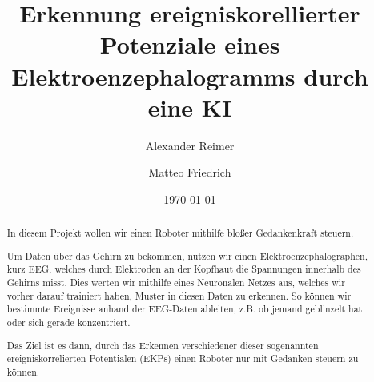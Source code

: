 \documentclass{scrartcl}
\title{Erkennung ereigniskorellierter Potenziale eines Elektroenzephalogramms durch eine KI }
\date{\today}
\author{Alexander Reimer \and Matteo Friedrich}
\begin{document}
	\maketitle
    \begin{abstract}
		In diesem Projekt wollen wir einen Roboter mithilfe bloßer Gedankenkraft steuern.
		
		Um Daten über das Gehirn zu bekommen, nutzen wir einen Elektroenzephalographen, kurz EEG, welches durch Elektroden an der Kopfhaut die Spannungen innerhalb des Gehirns misst. Dies werten wir mithilfe eines Neuronalen Netzes aus, welches wir vorher darauf trainiert haben, Muster in diesen Daten zu erkennen. So können wir bestimmte Ereignisse anhand der EEG-Daten ableiten, z.B. ob jemand geblinzelt hat oder sich gerade konzentriert.
		
		Das Ziel ist es dann, durch das Erkennen verschiedener dieser sogenannten ereigniskorrelierten Potentialen (EKPs) einen Roboter nur mit Gedanken steuern zu können. 
	\end{abstract}
\end{document}
